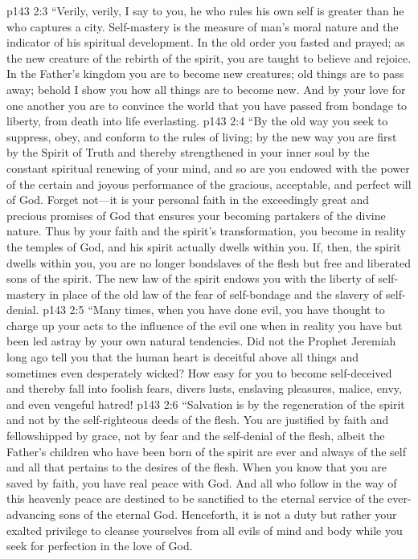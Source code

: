 \vs p143 2:3 \textcolor{ubdarkred}{“Verily, verily, I say to you, he who rules his own self is greater than he who captures a city. Self\hyp{}mastery is the measure of man’s moral nature and the indicator of his spiritual development. In the old order you fasted and prayed; as the new creature of the rebirth of the spirit, you are taught to believe and rejoice. In the Father’s kingdom you are to become new creatures; old things are to pass away; behold I show you how all things are to become new. And by your love for one another you are to convince the world that you have passed from bondage to liberty, from death into life everlasting.}
\vs p143 2:4 \textcolor{ubdarkred}{“By the old way you seek to suppress, obey, and conform to the rules of living; by the new way you are first  by the Spirit of Truth and thereby strengthened in your inner soul by the constant spiritual renewing of your mind, and so are you endowed with the power of the certain and joyous performance of the gracious, acceptable, and perfect will of God. Forget not---it is your personal faith in the exceedingly great and precious promises of God that ensures your becoming partakers of the divine nature. Thus by your faith and the spirit’s transformation, you become in reality the temples of God, and his spirit actually dwells within you. If, then, the spirit dwells within you, you are no longer bondslaves of the flesh but free and liberated sons of the spirit. The new law of the spirit endows you with the liberty of self\hyp{}mastery in place of the old law of the fear of self\hyp{}bondage and the slavery of self\hyp{}denial.}
\vs p143 2:5 \textcolor{ubdarkred}{“Many times, when you have done evil, you have thought to charge up your acts to the influence of the evil one when in reality you have but been led astray by your own natural tendencies. Did not the Prophet Jeremiah long ago tell you that the human heart is deceitful above all things and sometimes even desperately wicked? How easy for you to become self\hyp{}deceived and thereby fall into foolish fears, divers lusts, enslaving pleasures, malice, envy, and even vengeful hatred!}
\vs p143 2:6 \textcolor{ubdarkred}{“Salvation is by the regeneration of the spirit and not by the self\hyp{}righteous deeds of the flesh. You are justified by faith and fellowshipped by grace, not by fear and the self\hyp{}denial of the flesh, albeit the Father’s children who have been born of the spirit are ever and always  of the self and all that pertains to the desires of the flesh. When you know that you are saved by faith, you have real peace with God. And all who follow in the way of this heavenly peace are destined to be sanctified to the eternal service of the ever\hyp{}advancing sons of the eternal God. Henceforth, it is not a duty but rather your exalted privilege to cleanse yourselves from all evils of mind and body while you seek for perfection in the love of God.}
